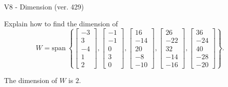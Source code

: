 \begin{exercise}
  \begin{exerciseTitle}V8 - Dimension (ver. 429)\end{exerciseTitle}
  \begin{exerciseStatement}
    Explain how to find the dimension of 
\[W=\mathrm{span}\ \left\{\left[\begin{array}{r}
-3 \\
3 \\
-4 \\
1 \\
2
\end{array}\right] , \left[\begin{array}{r}
-1 \\
-1 \\
0 \\
3 \\
0
\end{array}\right] , \left[\begin{array}{r}
16 \\
-14 \\
20 \\
-8 \\
-10
\end{array}\right] , \left[\begin{array}{r}
26 \\
-22 \\
32 \\
-14 \\
-16
\end{array}\right] , \left[\begin{array}{r}
36 \\
-24 \\
40 \\
-28 \\
-20
\end{array}\right]\right\}.\]



  \end{exerciseStatement}
  \begin{exerciseAnswer}
   The dimension of \(W\) is  \(2\).
  


  \end{exerciseAnswer}
\end{exercise}